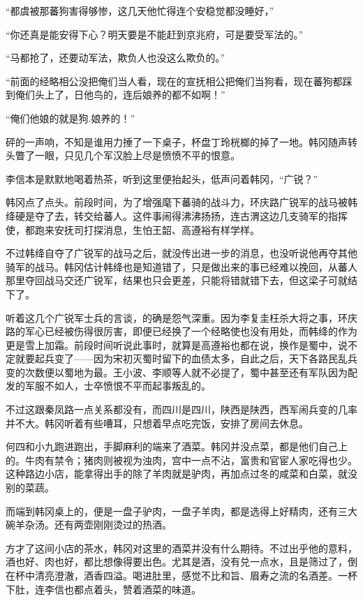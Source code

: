 “都虞被那蕃狗害得够惨，这几天他忙得连个安稳觉都没睡好，”

“你还真是能安得下心？明天要是不能赶到京兆府，可是要受军法的。”

“马都抢了，还要动军法，欺负人也没这么欺负的。”

“前面的经略相公没把俺们当人看，现在的宣抚相公把俺们当狗看，现在蕃狗都踩到俺们头上了，日他鸟的，连后娘养的都不如啊！”

“俺们他娘的就是狗.娘养的！”

砰的一声响，不知是谁用力捶了一下桌子，杯盘丁玲桄榔的掉了一地。韩冈随声转头瞥了一眼，只见几个军汉脸上尽是愤愤不平的恨意。

李信本是默默地喝着热茶，听到这里便抬起头，低声问着韩冈，“广锐？”

韩冈点了点头。前段时间，为了增强麾下蕃骑的战斗力，环庆路广锐军的战马被韩绛硬是夺了去，转交给蕃人。这件事闹得沸沸扬扬，连古渭这边几支骑军的指挥使，都跑来安抚司打探消息，生怕王韶、高遵裕有样学样。

不过韩绛自夺了广锐军的战马之后，就没传出进一步的消息，也没听说他再夺其他骑军的战马。韩冈估计韩绛也是知道错了，只是做出来的事已经难以挽回，从蕃人那里夺回战马交还广锐军，结果也只会更差，只能将错就错下去，但这梁子可就结下了。

听着这几个广锐军士兵的言谈，的确是怨气深重。因为李复圭枉杀大将之事，环庆路的军心已经被伤得很厉害，即便已经换了一个经略使也没有用处，而韩绛的作为更是雪上加霜。前段时间听说此事时，就算是高遵裕也都在说，换作是蜀中，说不定就要起兵变了——因为宋初灭蜀时留下的血债太多，自此之后，天下各路民乱兵变的次数便以蜀地为最。王小波、李顺等人就不必提了，蜀中甚至还有军队因为配发的军服不如人，士卒愤恨不平而起事叛乱的。

不过这跟秦凤路一点关系都没有，而四川是四川，陕西是陕西，西军闹兵变的几率并不大。韩冈听着有些嘈耳，只想着早点吃完饭，安排了房间去休息。

何四和小九跑进跑出，手脚麻利的端来了酒菜。韩冈并没点菜，都是他们自己上的。牛肉有禁令；猪肉则被视为浊肉，宫中一点不沾，富贵和官宦人家吃得也少。这种路边小店，能拿得出手的除了羊肉就是驴肉，再加点过冬的咸菜和白菜，就没别的菜蔬。

而端到韩冈桌上的，便是一盘子驴肉，一盘子羊肉，都是选得上好精肉，还有三大碗羊杂汤。还有两壶刚刚烫过的热酒。

方才了这间小店的茶水，韩冈对这里的酒菜并没有什么期待。不过出乎他的意料，酒也好、肉也好，都比想像得要出色。尤其是酒，没有兑一点水，且是筛过了，倒在杯中清亮澄澈，酒香四溢。喝进肚里，感觉不比和旨、眉寿之流的名酒差。一杯下肚，连李信也都点着头，赞着酒菜的味道。

